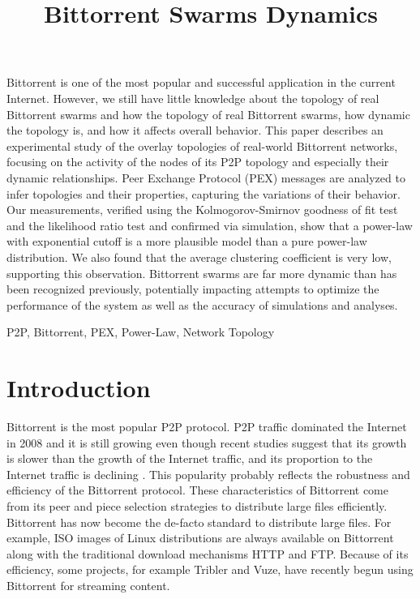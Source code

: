 \documentclass[paper]{ieice}
\title{Bittorrent Swarms Dynamics}
\begin{document}
\maketitle

\begin{summary}
Bittorrent is one of the most popular and successful application in the current Internet.
However, we still have little knowledge about the topology of real Bittorrent swarms and how the topology of real Bittorrent swarms, how dynamic the topology is, and how it affects overall behavior.
This paper describes an experimental study of the overlay topologies of real-world Bittorrent networks, focusing on the activity of the nodes of its P2P topology and especially their dynamic relationships. 
Peer Exchange Protocol (PEX) messages are analyzed to infer topologies and their properties, capturing the variations of their behavior.  
Our measurements, verified using the Kolmogorov-Smirnov goodness of fit test and the likelihood ratio test and confirmed via simulation, show that a power-law with exponential cutoff is a more plausible model than a pure power-law distribution.  
We also found that the average clustering coefficient is very low, supporting this observation.  
Bittorrent swarms are far more dynamic than has been recognized previously, potentially impacting attempts to optimize the performance of the system as well as the accuracy of simulations and analyses.
\end{summary}
\begin{keywords}
P2P, Bittorrent, PEX, Power-Law, Network Topology 
\end{keywords}


\section{Introduction}
Bittorrent is the most popular P2P protocol.
P2P traffic dominated the Internet in 2008 and it is still growing even though recent studies suggest that its growth is slower than the growth of the Internet traffic, and its proportion to the Internet traffic is declining \cite{labovitz2010internet} \cite{index2010forecast}.
This popularity probably reflects the robustness and efficiency of the Bittorrent protocol. 
These characteristics of Bittorrent come from its peer and piece selection strategies to distribute large files efficiently. 
Bittorrent has now become the de-facto standard to distribute large files. 
For example, ISO images of Linux distributions are always available on Bittorrent along with the traditional download mechanisms HTTP and FTP.  
Because of its efficiency, some projects, for example Tribler and Vuze, have recently begun using Bittorrent for streaming content.
\end{document}
